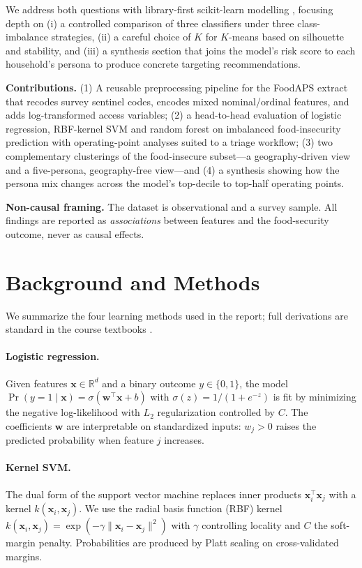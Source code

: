 \documentclass[10pt,letterpaper]{article}
\begin{document}
We address both questions with library-first scikit-learn modelling
\cite{scikit-learn}, focusing depth on (i) a controlled comparison of
three classifiers under three class-imbalance strategies, (ii) a careful
choice of $K$ for $K$-means based on silhouette and stability, and
(iii) a synthesis section that joins the model's risk score to each
household's persona to produce concrete targeting recommendations.

\textbf{Contributions.}
(1) A reusable preprocessing pipeline for the FoodAPS extract that
recodes survey sentinel codes, encodes mixed nominal/ordinal features,
and adds log-transformed access variables;
(2) a head-to-head evaluation of logistic regression, RBF-kernel SVM
and random forest on imbalanced food-insecurity prediction with
operating-point analyses suited to a triage workflow;
(3) two complementary clusterings of the food-insecure subset---a
geography-driven view and a five-persona, geography-free view---and
(4) a synthesis showing how the persona mix changes across the model's
top-decile to top-half operating points.

\textbf{Non-causal framing.} The dataset is observational and a survey
sample.  All findings are reported as \emph{associations} between
features and the food-security outcome, never as causal effects.

\section{Background and Methods}
\label{sec:background}
We summarize the four learning methods used in the report; full
derivations are standard in the course textbooks
\cite{murphy2022,boyd2018,blum2020}.

\paragraph{Logistic regression.}
Given features $\mathbf{x}\in\mathbb{R}^d$ and a binary outcome
$y\in\{0,1\}$, the model
$\Pr(y=1\mid\mathbf{x})=\sigma(\mathbf{w}^\top\mathbf{x}+b)$ with
$\sigma(z)=1/(1+e^{-z})$ is fit by minimizing the negative
log-likelihood with $L_2$ regularization controlled by $C$.  The
coefficients $\mathbf{w}$ are interpretable on standardized
inputs: $w_j>0$ raises the predicted probability when feature $j$
increases.

\paragraph{Kernel SVM.}
The dual form of the support vector machine
\cite{murphy2022} replaces inner products $\mathbf{x}_i^\top\mathbf{x}_j$
with a kernel $k(\mathbf{x}_i,\mathbf{x}_j)$.  We use the radial basis
function (RBF) kernel
$k(\mathbf{x}_i,\mathbf{x}_j)=\exp(-\gamma\|\mathbf{x}_i-\mathbf{x}_j\|^2)$
with $\gamma$ controlling locality and $C$ the soft-margin penalty.
Probabilities are produced by Platt scaling on cross-validated
margins.
\end{document}
